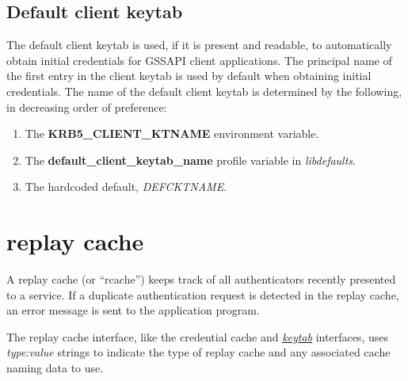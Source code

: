 \documentclass[letterpaper,10pt,english]{sphinxmanual}
\begin{document}
\section{Default client keytab}
\label{basic/keytab_def:default-client-keytab}
The default client keytab is used, if it is present and readable, to
automatically obtain initial credentials for GSSAPI client
applications.  The principal name of the first entry in the client
keytab is used by default when obtaining initial credentials.  The
name of the default client keytab is determined by the following, in
decreasing order of preference:
\begin{enumerate}
\item {} 
The \textbf{KRB5\_CLIENT\_KTNAME} environment variable.

\item {} 
The \textbf{default\_client\_keytab\_name} profile variable in
\emph{libdefaults}.

\item {} 
The hardcoded default, \emph{DEFCKTNAME}.

\end{enumerate}


\chapter{replay cache}
\label{basic/rcache_def:replay-cache}\label{basic/rcache_def:rcache-definition}\label{basic/rcache_def::doc}
A replay cache (or ``rcache'') keeps track of all authenticators
recently presented to a service.  If a duplicate authentication
request is detected in the replay cache, an error message is sent to
the application program.

The replay cache interface, like the credential cache and
{\hyperref[basic/keytab_def:keytab-definition]{\emph{keytab}}} interfaces, uses \emph{type:value} strings to
indicate the type of replay cache and any associated cache naming
data to use.
\end{document}
